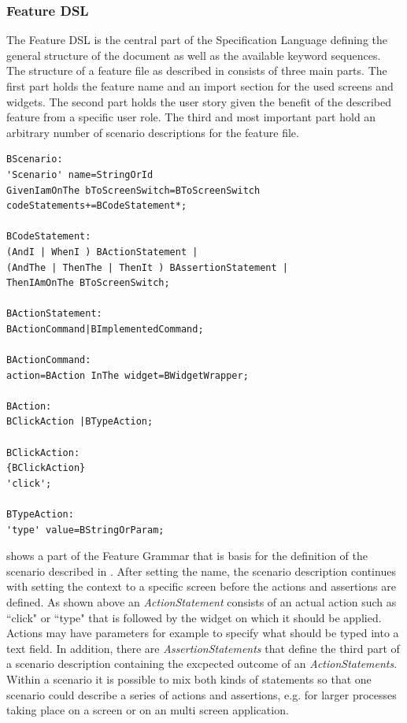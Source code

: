 \documentclass{sig-alternate-05-2015}
\begin{document}
\subsubsection{Feature DSL}
The Feature DSL is the central part of the Specification Language defining the general structure of the document as well as the available keyword sequences.
The structure of a feature file as described in  consists of three main parts.
The first part holds the feature name and an import section for the used screens and widgets.
The second part holds the user story given the benefit of the described feature from a specific user role.
The third and most important part hold an arbitrary number of scenario descriptions for the feature file.

\begin{lstlisting}[captionpos=b, caption=Feature Grammar, label={lst:featureGrammar}, language=xtext]
BScenario:
'Scenario' name=StringOrId
GivenIamOnThe bToScreenSwitch=BToScreenSwitch 
codeStatements+=BCodeStatement*;

BCodeStatement:
(AndI | WhenI ) BActionStatement | 
(AndThe | ThenThe | ThenIt ) BAssertionStatement |   
ThenIAmOnThe BToScreenSwitch;

BActionStatement:
BActionCommand|BImplementedCommand;

BActionCommand:
action=BAction InThe widget=BWidgetWrapper;

BAction:
BClickAction |BTypeAction;

BClickAction:
{BClickAction}
'click';

BTypeAction:
'type' value=BStringOrParam;
\end{lstlisting}

 shows a part of the Feature Grammar that is basis for the definition of the scenario described in .
After setting the name, the scenario description continues with setting the context to a specific screen before the actions and assertions are defined.
As shown above an \textit{ActionStatement} consists of an actual action such as ``click" or ``type" that is followed by the widget on which it should be applied.
Actions may have parameters for example to specify what should be typed into a text field. 
In addition, there are \textit{AssertionStatements} that define the third part of a scenario description containing the excpected outcome of an \textit{ActionStatements}.
Within a scenario it is possible to mix both kinds of statements so that one scenario could describe a series of actions and assertions, e.g. for larger processes taking place on a screen or on an multi screen application.   
\end{document}

